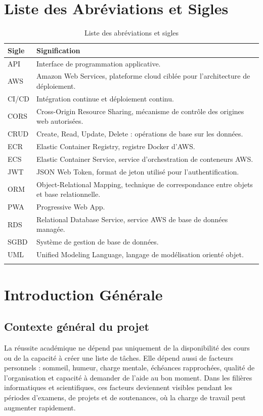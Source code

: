 \documentclass{rapportENSET}
\begin{document}
\section*{Liste des Abréviations et Sigles}
\begin{longtable}{@{}L{0.22\textwidth}L{0.68\textwidth}@{}}
\toprule
\textbf{Sigle} & \textbf{Signification} \\
\midrule
\endhead
API & Interface de programmation applicative. \\
AWS & Amazon Web Services, plateforme cloud ciblée pour l'architecture de déploiement. \\
CI/CD & Intégration continue et déploiement continu. \\
CORS & Cross-Origin Resource Sharing, mécanisme de contrôle des origines web autorisées. \\
CRUD & Create, Read, Update, Delete : opérations de base sur les données. \\
ECR & Elastic Container Registry, registre Docker d'AWS. \\
ECS & Elastic Container Service, service d'orchestration de conteneurs AWS. \\
JWT & JSON Web Token, format de jeton utilisé pour l'authentification. \\
ORM & Object-Relational Mapping, technique de correspondance entre objets et base relationnelle. \\
PWA & Progressive Web App. \\
RDS & Relational Database Service, service AWS de base de données managée. \\
SGBD & Système de gestion de base de données. \\
UML & Unified Modeling Language, langage de modélisation orienté objet. \\
\bottomrule
\caption{Liste des abréviations et sigles}
\end{longtable}

\newpage
{}


\section*{Introduction Générale}
\subsection*{Contexte général du projet}
La réussite académique ne dépend pas uniquement de la disponibilité des cours ou de la capacité à créer une liste de tâches. Elle dépend aussi de facteurs personnels : sommeil, humeur, charge mentale, échéances rapprochées, qualité de l'organisation et capacité à demander de l'aide au bon moment. Dans les filières informatiques et scientifiques, ces facteurs deviennent visibles pendant les périodes d'examens, de projets et de soutenances, où la charge de travail peut augmenter rapidement.
\end{document}
